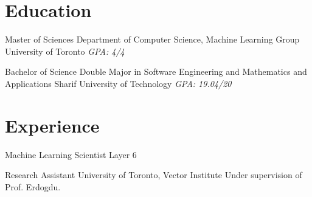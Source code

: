 \documentclass{moderncv}
\begin{document}
\makecvtitle
\section{Education}

{Master of Sciences}
{Department of Computer Science, Machine Learning Group}
{University of Toronto}
{}
{\textit{GPA: 4/4}}

{Bachelor of Science}
{Double Major in Software Engineering and Mathematics and Applications}
{Sharif University of Technology}
{}
{\textit{GPA: 19.04/20}}

\section{Experience}
{Machine Learning Scientist}
{Layer 6}
{}{}{}

{Research Assistant}
{University of Toronto, Vector Institute}
{}{}
{Under supervision of Prof. Erdogdu.}

\nocite{*}



%
%
%

\end{document}
